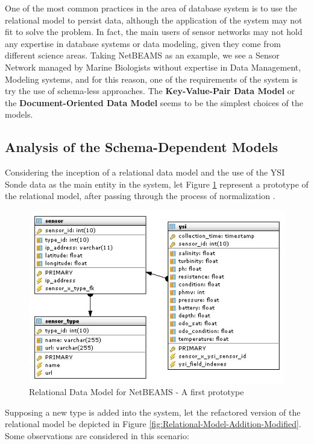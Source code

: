 One of the most common practices in the area of database system is to use the
relational model to persist data, although the application of the system may
not fit to solve the problem. In fact, the main users of sensor networks may
not hold any expertise in database systems or data modeling, given they come
from different science areas. Taking NetBEAMS as an example, we see a Sensor
Network managed by Marine Biologists without expertise in Data Management,
Modeling systems, and for this reason, one of the requirements of the system is
try the use of schema-less approaches. The \textbf{Key-Value-Pair Data Model}
or the \textbf{Document-Oriented Data Model} seems to be the simplest choices of the
models.

\subsection{Analysis of the Schema-Dependent Models}

Considering the inception of a relational data model \cite{relational-model} and
the use of the YSI Sonde data as the main entity in the system, let Figure 
\ref{fig:Relational-Model-Original} represent a prototype of the relational
model, after passing through the process of normalization
\cite{db-normalization}.

\begin{figure}
  \centering
  \includegraphics[scale=0.65]{../diagrams/Relational-Model-Original}
  \caption{Relational Data Model for NetBEAMS - A first prototype}
  \label{fig:Relational-Model-Original}
\end{figure}

Supposing a new type is added into the system, let the refactored
version of the relational model be depicted in Figure
\ref{fig:Relational-Model-Addition-Modified}. Some observations are considered
in this scenario:

